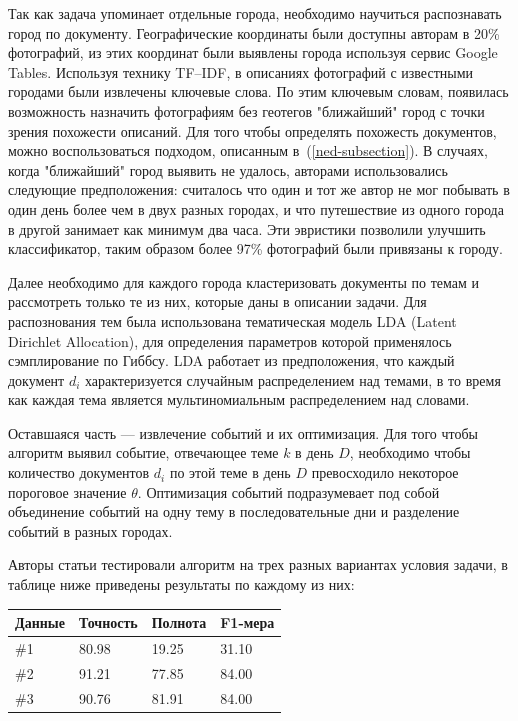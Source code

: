 \documentclass[12pt, a4paper]{article}
\begin{document}
	Так как задача упоминает отдельные города, необходимо научиться распознавать город по документу. Географические координаты были доступны авторам в 20\% фотографий, из этих координат были выявлены города используя сервис Google Tables. Используя технику TF--IDF, в описаниях фотографий с известными городами были извлечены ключевые слова. По этим ключевым словам, появилась возможность назначить фотографиям без геотегов "ближайший" город с точки зрения похожести описаний. Для того чтобы определять похожесть документов, можно воспользоваться подходом, описанным в~(\ref{ned-subsection}). В случаях, когда "ближайший" город выявить не удалось, авторами использовались следующие предположения: считалось что один и тот же автор не мог побывать в один день более чем в двух разных городах, и что путешествие из одного города в другой занимает как минимум два часа. Эти эвристики позволили улучшить классификатор, таким образом более 97\% фотографий были привязаны к городу.
	
	Далее необходимо для каждого города кластеризовать документы по темам и рассмотреть только те из них, которые даны в описании задачи. Для распознования тем была использована тематическая модель LDA (Latent Dirichlet Allocation)\cite{lda-model}, для определения параметров которой применялось сэмплирование по Гиббсу\cite{lda-gibbs}. LDA работает из предположения, что каждый документ $d_i$ характеризуется случайным распределением над темами, в то время как каждая тема является мультиномиальным распределением над словами.
	
	Оставшаяся часть --- извлечение событий и их оптимизация. Для того чтобы алгоритм выявил событие, отвечающее теме $k$ в день $D$, необходимо чтобы количество документов $d_i$ по этой теме в день $D$ превосходило некоторое пороговое значение $\theta$. Оптимизация событий подразумевает под собой объединение событий на одну тему в последовательные дни и разделение событий в разных городах.
	
	Авторы статьи тестировали алгоритм на трех разных вариантах условия задачи, в таблице ниже приведены результаты по каждому из них:
	
\begin{center}
    \begin{tabular}{| l | l | l | l | }
    \hline
    Данные & Точность & Полнота & F1-мера \\ \hline
    \#1 & 80.98 & 19.25 & 31.10 \\ \hline
    \#2 & 91.21 & 77.85 & 84.00  \\ \hline
    \#3 & 90.76 & 81.91 & 84.00 \\
    \hline
    \end{tabular}
\end{center}
  
\end{document}
